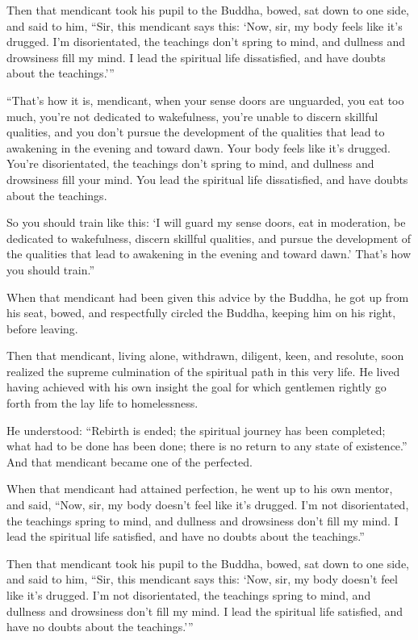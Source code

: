 \documentclass[12pt,openany]{book}%
\begin{document}
Then that mendicant took his pupil to the Buddha, bowed, sat down to one side, and said to him, “Sir, this mendicant says this: ‘Now, sir, my body feels like it’s drugged. I’m disorientated, the teachings don’t spring to mind, and dullness and drowsiness fill my mind. I lead the spiritual life dissatisfied, and have doubts about the teachings.’” 

“That’s how it is, mendicant, when your sense doors are unguarded, you eat too much, you’re not dedicated to wakefulness, you’re unable to discern skillful qualities, and you don’t pursue the development of the qualities that lead to awakening in the evening and toward dawn. Your body feels like it’s drugged. You’re disorientated, the teachings don’t spring to mind, and dullness and drowsiness fill your mind. You lead the spiritual life dissatisfied, and have doubts about the teachings. 

So you should train like this: ‘I will guard my sense doors, eat in moderation, be dedicated to wakefulness, discern skillful qualities, and pursue the development of the qualities that lead to awakening in the evening and toward dawn.’ That’s how you should train.” 

When that mendicant had been given this advice by the Buddha, he got up from his seat, bowed, and respectfully circled the Buddha, keeping him on his right, before leaving. 

Then that mendicant, living alone, withdrawn, diligent, keen, and resolute, soon realized the supreme culmination of the spiritual path in this very life. He lived having achieved with his own insight the goal for which gentlemen rightly go forth from the lay life to homelessness. 

He understood: “Rebirth is ended; the spiritual journey has been completed; what had to be done has been done; there is no return to any state of existence.” And that mendicant became one of the perfected. 

When that mendicant had attained perfection, he went up to his own mentor, and said, “Now, sir, my body doesn’t feel like it’s drugged. I’m not disorientated, the teachings spring to mind, and dullness and drowsiness don’t fill my mind. I lead the spiritual life satisfied, and have no doubts about the teachings.” 

Then that mendicant took his pupil to the Buddha, bowed, sat down to one side, and said to him, “Sir, this mendicant says this: ‘Now, sir, my body doesn’t feel like it’s drugged. I’m not disorientated, the teachings spring to mind, and dullness and drowsiness don’t fill my mind. I lead the spiritual life satisfied, and have no doubts about the teachings.’” 
\end{document}
